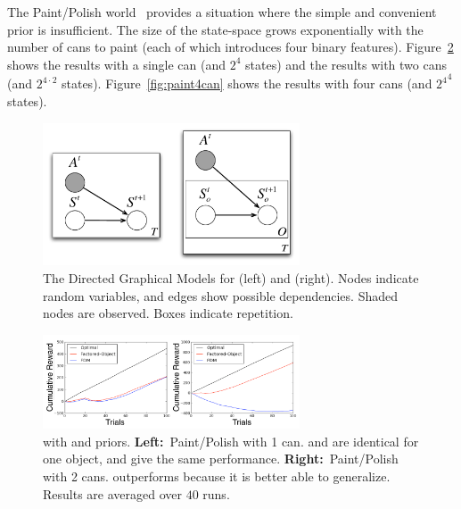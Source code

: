 The Paint/Polish world~\cite{walsh09a} provides a situation where the simple and convenient  prior is insufficient. The size of the state-space grows exponentially with the number of cans to paint (each of which introduces four binary features). Figure~\ref{fig:paint1-2can} shows the results with a single can (and $2^4$ states) and the results with two cans (and $2^{4\cdot 2}$ states). Figure~\ref{fig:paint4can} shows the results with four cans (and ${2^4}^4$ states).


\begin{figure}
\vskip 0.2in
\begin{center}
\centerline{\includegraphics[width=3in]{dgms}}
\caption{
The Directed Graphical Models for  (left) and  (right). Nodes indicate random variables, and edges show possible dependencies. Shaded nodes are observed. Boxes indicate repetition.
}
\label{fig:dgms}
\end{center}
\vskip -0.2in
\end{figure} 

\begin{figure}
\vskip 0.2in
\begin{center}
\centerline{\includegraphics[width=3in]{paint1-2can}}
\caption{
 with  and  priors. {\bf Left:}~Paint/Polish with 1 can.  and  are identical for one object, and give the same performance. {\bf Right:}~Paint/Polish with 2 cans.  outperforms  because it is better able to generalize. Results are averaged over $40$ runs.
}
\label{fig:paint1-2can}
\end{center}
\vskip -0.2in
\end{figure} 

